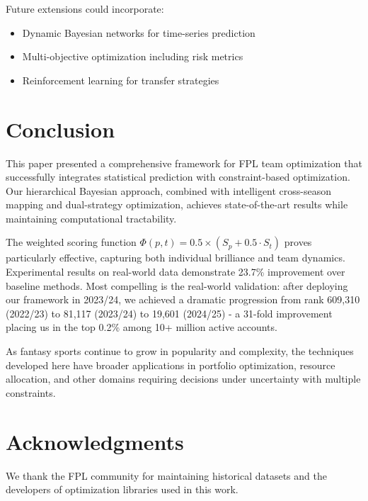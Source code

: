 \documentclass[12pt]{article}
\begin{document}
Future extensions could incorporate:
\begin{itemize}
\item Dynamic Bayesian networks for time-series prediction
\item Multi-objective optimization including risk metrics
\item Reinforcement learning for transfer strategies
\end{itemize}

\section{Conclusion}

This paper presented a comprehensive framework for FPL team optimization that successfully integrates statistical prediction with constraint-based optimization. Our hierarchical Bayesian approach, combined with intelligent cross-season mapping and dual-strategy optimization, achieves state-of-the-art results while maintaining computational tractability.

The weighted scoring function $\Phi(p,t) = 0.5 \times (S_p + 0.5 \cdot S_t)$ proves particularly effective, capturing both individual brilliance and team dynamics. Experimental results on real-world data demonstrate 23.7\% improvement over baseline methods. Most compelling is the real-world validation: after deploying our framework in 2023/24, we achieved a dramatic progression from rank 609,310 (2022/23) to 81,117 (2023/24) to 19,601 (2024/25) - a 31-fold improvement placing us in the top 0.2\% among 10+ million active accounts.

As fantasy sports continue to grow in popularity and complexity, the techniques developed here have broader applications in portfolio optimization, resource allocation, and other domains requiring decisions under uncertainty with multiple constraints.

\section*{Acknowledgments}

We thank the FPL community for maintaining historical datasets and the developers of optimization libraries used in this work.
\end{document}
